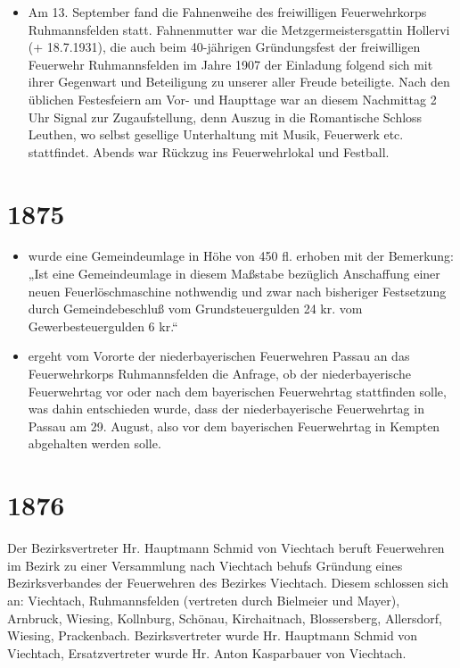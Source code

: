 \documentclass[12pt,a4paper]{book}
\begin{document}
\begin{itemize}
\item Am 13. September fand die Fahnenweihe des freiwilligen Feuerwehrkorps
Ruhmannsfelden statt. Fahnenmutter war die Metzgermeistersgattin Hollervi (+
18.7.1931), die auch beim 40-jährigen Gründungsfest der freiwilligen Feuerwehr
Ruhmannsfelden im Jahre 1907 der Einladung folgend sich mit ihrer Gegenwart und
Beteiligung zu unserer aller Freude beteiligte. Nach den üblichen Festesfeiern
am Vor- und Haupttage war an diesem Nachmittag 2 Uhr Signal zur Zugaufstellung,
denn Auszug in die Romantische Schloss Leuthen, wo selbst gesellige Unterhaltung
mit Musik, Feuerwerk etc. stattfindet. Abends war Rückzug ins Feuerwehrlokal und
Festball.
\end{itemize}

\section*{1875}

\begin{itemize}
\item wurde eine Gemeindeumlage in Höhe von 450 fl. erhoben mit der Bemerkung:
„Ist eine Gemeindeumlage in diesem Maßstabe bezüglich Anschaffung einer neuen
Feuerlöschmaschine nothwendig und zwar nach bisheriger Festsetzung durch
Gemeindebeschluß vom Grundsteuergulden 24 kr. vom Gewerbesteuergulden 6 kr.“

\item ergeht vom Vororte der niederbayerischen Feuerwehren Passau an das
Feuerwehrkorps Ruhmannsfelden die Anfrage, ob der niederbayerische Feuerwehrtag
vor oder nach dem bayerischen Feuerwehrtag stattfinden solle, was dahin
entschieden wurde, dass der niederbayerische Feuerwehrtag in Passau am 29.
August, also vor dem bayerischen Feuerwehrtag in Kempten abgehalten werden
solle.
\end{itemize}

\section*{1876}

Der Bezirksvertreter Hr. Hauptmann Schmid von Viechtach beruft Feuerwehren im
Bezirk zu einer Versammlung nach Viechtach behufs Gründung eines
Bezirksverbandes der Feuerwehren des Bezirkes Viechtach. Diesem schlossen sich
an: Viechtach, Ruhmannsfelden (vertreten durch Bielmeier und Mayer), Arnbruck,
Wiesing, Kollnburg, Schönau, Kirchaitnach, Blossersberg, Allersdorf, Wiesing,
Prackenbach. Bezirksvertreter wurde Hr. Hauptmann Schmid von Viechtach,
Ersatzvertreter wurde Hr. Anton Kasparbauer von Viechtach.
\end{document}
